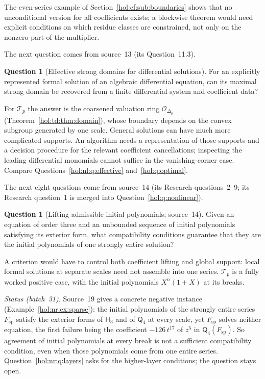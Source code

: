 \documentclass[11pt]{article}
\numberwithin{equation}{section}
\theoremstyle{definition}
\newtheorem{question}[theorem]{Question}
\theoremstyle{remark}
\begin{document}
The even-series example of Section~\ref{hol:cf:sub:boundaries} shows that no
unconditional version for all coefficients exists; a blockwise theorem would
need explicit conditions on which residue classes are constrained, not only
on the nonzero part of the multiplier.

The next question comes from source~13 (its Question~11.3).

\begin{question}[Effective strong domains for differential solutions]
\label{hol:td:q:domains}
For an explicitly represented formal solution of an algebraic differential
equation, can its maximal strong domain be recovered from a finite
differential system and coefficient data?
\end{question}

For $\mathcal T_p$ the answer is the coarsened valuation ring
$\mathcal O_{\Delta_\mu}$ (Theorem~\ref{hol:td:thm:domain}), whose boundary
depends on the convex subgroup generated by one scale. General solutions can
have much more complicated supports. An algorithm needs a representation of
those supports and a decision procedure for the relevant coefficient
cancellations; inspecting the leading differential monomials cannot suffice
in the vanishing-corner case. Compare Questions~\ref{hol:nl:q:effective}
and~\ref{hol:q:optimal}.

The next eight questions come from source~14 (its Research questions~2--9;
its Research question~1 is merged into Question~\ref{hol:q:nonlinear}).

\begin{question}[Lifting admissible initial polynomials; source~14]
\label{hol:ot:q:lift}
Given an equation of order three and an unbounded sequence of initial
polynomials satisfying its exterior form, what compatibility conditions
guarantee that they are the initial polynomials of one strongly entire
solution?
\end{question}

A criterion would have to control both coefficient lifting and global
support: local formal solutions at separate scales need not assemble into one
series. $\mathcal T_p$ is a fully worked positive case, with the initial
polynomials $X^n(1+X)$ at its breaks.

\emph{Status (batch~31).} Source~19 gives a concrete negative instance
(Example~\ref{hol:nr:ex:sparse}): the initial polynomials of the strongly
entire series $F_{\mathrm{sp}}$ satisfy the exterior forms of $\mathsf H_3$ and
of $\mathsf Q_4$ at every scale, yet $F_{\mathrm{sp}}$ solves neither
equation, the first failure being the coefficient $-126\,t^{17}$ of $z^5$ in
$\mathsf Q_4(F_{\mathrm{sp}})$. So agreement of initial polynomials at every
break is not a sufficient compatibility condition, even when those
polynomials come from one entire series. Question~\ref{hol:nr:q:layers} asks
for the higher-layer conditions; the question stays open.
\end{document}
